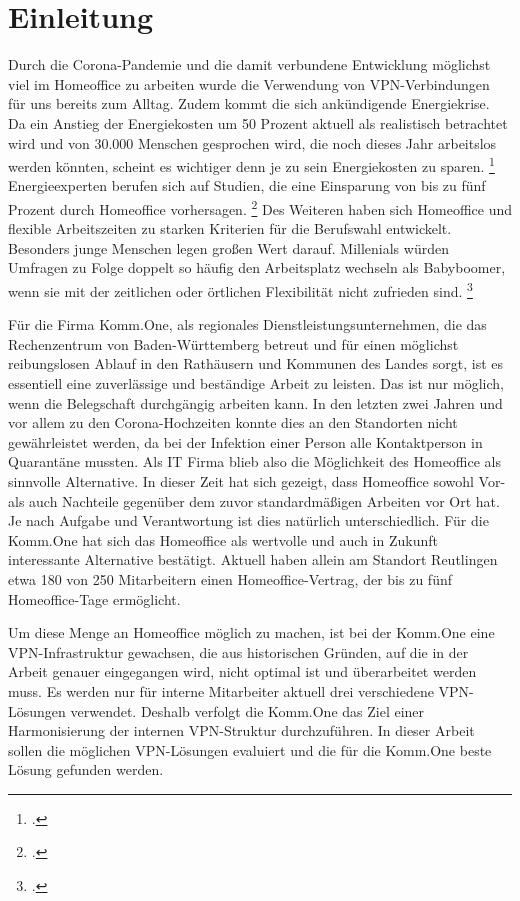 \chapter{Einleitung} %
\label{cha:Einleitung}

Durch die Corona-Pandemie und die damit verbundene Entwicklung möglichst viel im Homeoffice zu arbeiten wurde die Verwendung von VPN-Verbindungen für uns bereits zum Alltag. Zudem kommt die sich ankündigende Energiekrise. Da ein Anstieg der Energiekosten um 50 Prozent aktuell als realistisch betrachtet wird und von 30.000 Menschen gesprochen wird, die noch dieses Jahr arbeitslos werden könnten, scheint es wichtiger denn je zu sein Energiekosten zu sparen. \footcite[Vgl.][]{Gries.2022} Energieexperten berufen sich auf Studien, die eine Einsparung von bis zu fünf Prozent durch Homeoffice vorhersagen. \footcite[Vgl.][S. 1 f.]{Thaler.2022} Des Weiteren haben sich Homeoffice und flexible Arbeitszeiten zu starken Kriterien für die Berufswahl entwickelt. Besonders junge Menschen legen großen Wert darauf. Millenials würden Umfragen zu Folge doppelt so häufig den Arbeitsplatz wechseln als Babyboomer, wenn sie mit der zeitlichen oder örtlichen Flexibilität nicht zufrieden sind. \footcite[Vgl.][S. 1 f.]{Hahn.2021}

Für die Firma Komm.One, als regionales Dienstleistungsunternehmen, die das Rechenzentrum von Baden-Württemberg betreut und für einen möglichst reibungslosen Ablauf in den Rathäusern und Kommunen des Landes sorgt, ist es essentiell eine zuverlässige und beständige Arbeit zu leisten. Das ist nur möglich, wenn die Belegschaft durchgängig arbeiten kann. In den letzten zwei Jahren und vor allem zu den Corona-Hochzeiten konnte dies an den Standorten nicht gewährleistet werden, da bei der Infektion einer Person alle Kontaktperson in Quarantäne mussten. Als IT Firma blieb also die Möglichkeit des Homeoffice als sinnvolle Alternative. In dieser Zeit hat sich gezeigt, dass Homeoffice sowohl Vor- als auch Nachteile gegenüber dem zuvor standardmäßigen Arbeiten vor Ort hat. Je nach Aufgabe und Verantwortung ist dies natürlich unterschiedlich. Für die Komm.One hat sich das Homeoffice als wertvolle und auch in Zukunft interessante Alternative bestätigt. Aktuell haben allein am Standort Reutlingen etwa 180 von 250 Mitarbeitern einen Homeoffice-Vertrag, der bis zu fünf Homeoffice-Tage ermöglicht.

Um diese Menge an Homeoffice möglich zu machen, ist bei der Komm.One eine VPN-Infrastruktur gewachsen, die aus historischen Gründen, auf die in der Arbeit genauer eingegangen wird, nicht optimal ist und überarbeitet werden muss. Es werden nur für interne Mitarbeiter aktuell drei verschiedene VPN-Lösungen verwendet. Deshalb verfolgt die Komm.One das Ziel einer Harmonisierung der internen VPN-Struktur durchzuführen. In dieser Arbeit sollen die möglichen VPN-Lösungen evaluiert und die für die Komm.One beste Lösung gefunden werden.

